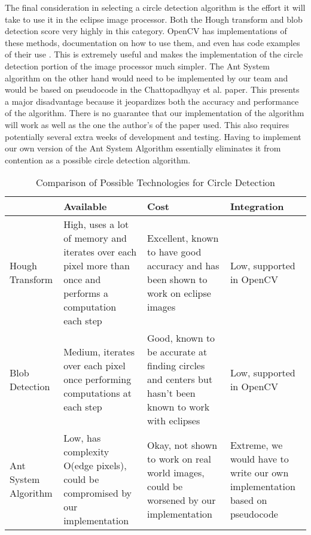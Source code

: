 \documentclass[10pt, onecolumn, draftclsnofoot, letterpaper, compsoc]{IEEEtran}
\begin{document}
The final consideration in selecting a circle detection algorithm is the effort
it will take to use it in the eclipse image processor. Both the Hough transform
and blob detection score very highly in this category. OpenCV has
implementations of these methods, documentation on how to use them, and even has
code examples of their use \cite{houghocv, blobarticle}. This is extremely useful
and makes the implementation of the circle detection portion of the image
processor much simpler. The Ant System algorithm on the other hand would need to
be implemented by our team and would be based on pseudocode in the Chattopadhyay
et al. paper. This presents a major disadvantage because it jeopardizes both the
accuracy and performance of the algorithm. There is no guarantee that our
implementation of the algorithm will work as well as the one the author's of the
paper used. This also requires potentially several extra weeks of development
and testing. Having to implement our own version of the Ant System Algorithm
essentially eliminates it from contention as a possible circle detection
algorithm. \\

\begin{table}[h]
\centering
\caption{Comparison of Possible Technologies for Circle Detection}
\begin{tabular}{|p{3.15cm}|p{3.15cm}|p{3.15cm}|p{3.15cm}|}
\cline{4-4}

\hline  & Available & Cost & Integration \\ \hline

Hough Transform & High, uses a lot of memory and iterates over each pixel more
than once and performs a computation each step & Excellent, known to have good
accuracy and has been shown to work on eclipse images & Low, supported in OpenCV
\\ \hline

Blob Detection & Medium, iterates over each pixel once performing computations
at each step & Good, known to be accurate at finding circles and centers but
hasn't been known to work with eclipses & Low, supported in OpenCV \\ \hline


Ant System Algorithm & Low, has complexity O(edge pixels), could be compromised
by our implementation & Okay, not shown to work on real world images, could be
worsened by our implementation & Extreme, we would have to write our own
implementation based on pseudocode \\ \hline

\end{tabular}
\label{table:george3}
\end{table}
\end{document}
